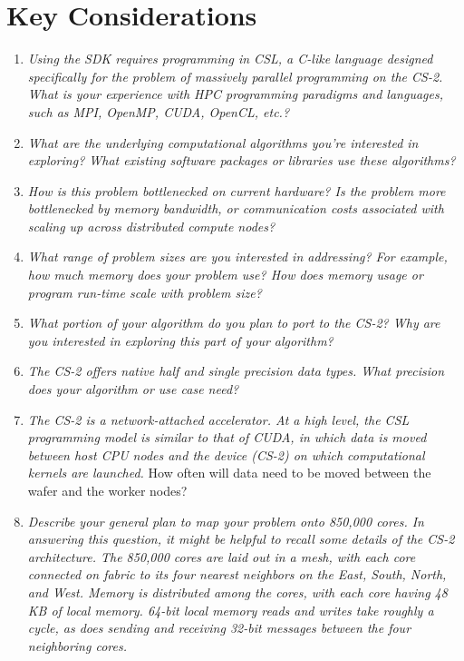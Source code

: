 \section{Key Considerations} \label{sec:key-Considerations}

\begin{enumerate}
    \item \textit{Using the SDK requires programming in CSL, a C-like language designed specifically for the problem of massively parallel programming on the CS-2.
    What is your experience with HPC programming paradigms and languages, such as MPI, OpenMP, CUDA, OpenCL, etc.?}
    \item \textit{What are the underlying computational algorithms you're interested in exploring?
    What existing software packages or libraries use these algorithms?}
    \item \textit{How is this problem bottlenecked on current hardware?
    Is the problem more bottlenecked by memory bandwidth, or communication costs associated with scaling up across distributed compute nodes?}
    \item \textit{What range of problem sizes are you interested in addressing?
    For example, how much memory does your problem use?
    How does memory usage or program run-time scale with problem size?}
    \item \textit{What portion of your algorithm do you plan to port to the CS-2?
    Why are you interested in exploring this part of your algorithm?}
    \item \textit{The CS-2 offers native half and single precision data types.
    What precision does your algorithm or use case need?}
    \item \textit{The CS-2 is a network-attached accelerator. At a high level, the CSL programming model is similar to that of CUDA, in which data is moved between host CPU nodes and the device (CS-2) on which computational kernels are launched.}
    How often will data need to be moved between the wafer and the worker nodes?
    \item \textit{Describe your general plan to map your problem onto 850,000 cores. In answering this question, it might be helpful to recall some details of the CS-2 architecture.
    The 850,000 cores are laid out in a mesh, with each core connected on fabric to its four nearest neighbors on the East, South, North, and West.
    Memory is distributed among the cores, with each core having 48 KB of local memory.
    64-bit local memory reads and writes take roughly a cycle, as does sending and receiving 32-bit messages between the four neighboring cores.}
\end{enumerate}
